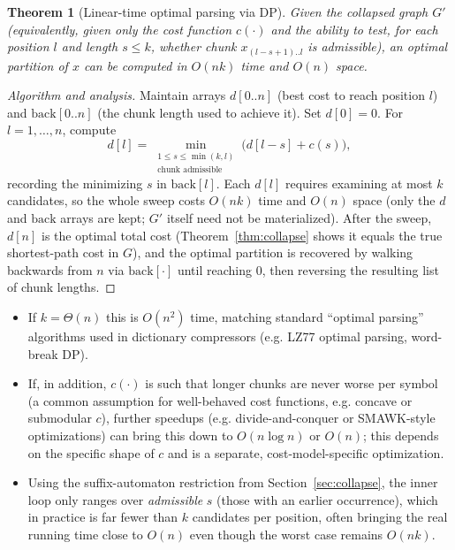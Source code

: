 \documentclass[11pt]{article}
\newtheorem{theorem}{Theorem}
\begin{document}
\begin{theorem}[Linear-time optimal parsing via DP]
Given the collapsed graph $G'$ (equivalently, given only the cost function $c(\cdot)$
and the ability to test, for each position $l$ and length $s \le k$, whether chunk
$x_{(l-s+1)..l}$ is admissible), an optimal partition of $x$ can be computed in
$O(nk)$ time and $O(n)$ space.
\end{theorem}

\begin{proof}[Algorithm and analysis]
Maintain arrays $d[0..n]$ (best cost to reach position $l$) and
$\mathrm{back}[0..n]$ (the chunk length used to achieve it). Set $d[0] = 0$. For
$l = 1, \dots, n$, compute
\[
  d[l] = \min_{\substack{1 \le s \le \min(k,l) \\ \text{chunk admissible}}}
  \big( d[l-s] + c(s) \big),
\]
recording the minimizing $s$ in $\mathrm{back}[l]$. Each $d[l]$ requires examining at
most $k$ candidates, so the whole sweep costs $O(nk)$ time and $O(n)$ space (only the
$d$ and $\mathrm{back}$ arrays are kept; $G'$ itself need not be materialized). After
the sweep, $d[n]$ is the optimal total cost (Theorem~\ref{thm:collapse} shows it equals
the true shortest-path cost in $G$), and the optimal partition is recovered by walking
backwards from $n$ via $\mathrm{back}[\cdot]$ until reaching $0$, then reversing the
resulting list of chunk lengths.
\end{proof}

\begin{itemize}
  \item If $k = \Theta(n)$ this is $O(n^2)$ time, matching standard ``optimal parsing''
  algorithms used in dictionary compressors (e.g. LZ77 optimal parsing, word-break DP).
  \item If, in addition, $c(\cdot)$ is such that longer chunks are never worse per
  symbol (a common assumption for well-behaved cost functions, e.g. concave or
  submodular $c$), further speedups (e.g. divide-and-conquer or SMAWK-style
  optimizations) can bring this down to $O(n \log n)$ or $O(n)$; this depends on the
  specific shape of $c$ and is a separate, cost-model-specific optimization.
  \item Using the suffix-automaton restriction from Section~\ref{sec:collapse}, the
  inner loop only ranges over \emph{admissible} $s$ (those with an earlier occurrence),
  which in practice is far fewer than $k$ candidates per position, often bringing the
  real running time close to $O(n)$ even though the worst case remains $O(nk)$.
\end{itemize}
\end{document}
